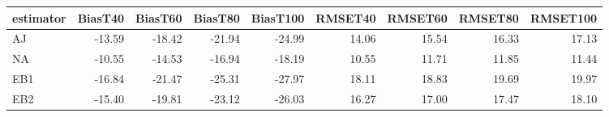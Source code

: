 \begin{table}[ht]
\centering
\begin{tabular}{lrrrrrrrr}
  \toprule
estimator & BiasT40 & BiasT60 & BiasT80 & BiasT100 & RMSET40 & RMSET60 & RMSET80 & RMSET100 \\ 
  \midrule
AJ & -13.59 & -18.42 & -21.94 & -24.99 & 14.06 & 15.54 & 16.33 & 17.13 \\ 
  NA & -10.55 & -14.53 & -16.94 & -18.19 & 10.55 & 11.71 & 11.85 & 11.44 \\ 
  EB1 & -16.84 & -21.47 & -25.31 & -27.97 & 18.11 & 18.83 & 19.69 & 19.97 \\ 
  EB2 & -15.40 & -19.81 & -23.12 & -26.03 & 16.27 & 17.00 & 17.47 & 18.10 \\ 
   \bottomrule
\end{tabular}
\end{table}
